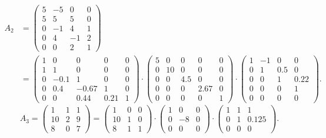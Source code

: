 \documentclass[
  course = {{16-811 Math Fundamentals for Robotics}},
  quartile = {{1}},
  assignment = 1,
  name = {{Kangle Deng}},
  email = {{kangled@andrew.cmu.edu}},
  firstexercise = 1
]{aga-homework}
\begin{document}
\begin{equation*}
\begin{aligned}
    A_2 & = 
    \left(
    \begin{array}{cccc}
        5 & -5 & 0 & 0 \\
        5 & 5 & 5 & 0 \\
        0 & -1 & 4 & 1 \\
        0 & 4 & -1 & 2 \\
        0 & 0 & 2 & 1
    \end{array}
    \right) 
    \\ 
    & =
    \left(
    \begin{array}{ccccc}
        1 & 0 & 0 & 0 & 0 \\
        1 & 1 & 0 & 0 & 0 \\
        0 & -0.1 & 1 & 0 & 0 \\
        0 & 0.4 & -0.67 & 1 & 0 \\
        0 & 0 & 0.44 & 0.21 & 1
    \end{array}
    \right) \cdot
    \left(
    \begin{array}{ccccc}
        5 & 0 & 0 & 0 & 0 \\
        0 & 10 & 0 & 0 & 0 \\
        0 & 0 & 4.5 & 0 & 0 \\
        0 & 0 & 0 & 2.67 & 0 \\
        0 & 0 & 0 & 0 & 1
    \end{array}
    \right) \cdot
    \left(
    \begin{array}{cccc}
        1 & -1 & 0 & 0 \\
        0 & 1 & 0.5 & 0 \\
        0 & 0 & 1 & 0.22 \\
        0 & 0 & 0 & 1 \\
        0 & 0 & 0 & 0
    \end{array}
    \right).
\end{aligned}
\end{equation*}
\begin{equation*}
    A_3 = 
    \left(
    \begin{array}{ccc}
        1 & 1 & 1 \\
        10 & 2 & 9 \\
        8 & 0 & 7
    \end{array}
    \right) =
    \left(
    \begin{array}{ccc}
        1 & 0 & 0 \\
        10 & 1 & 0 \\
        8 & 1 & 1
    \end{array}
    \right) \cdot
    \left(
    \begin{array}{ccc}
        1 & 0 & 0 \\
        0 & -8 & 0 \\
        0 & 0 & 0
    \end{array}
    \right) \cdot
    \left(
    \begin{array}{ccc}
        1 & 1 & 1 \\
        0 & 1 & 0.125 \\
        0 & 0 & 0
    \end{array}
    \right).
\end{equation*}
\end{document}
